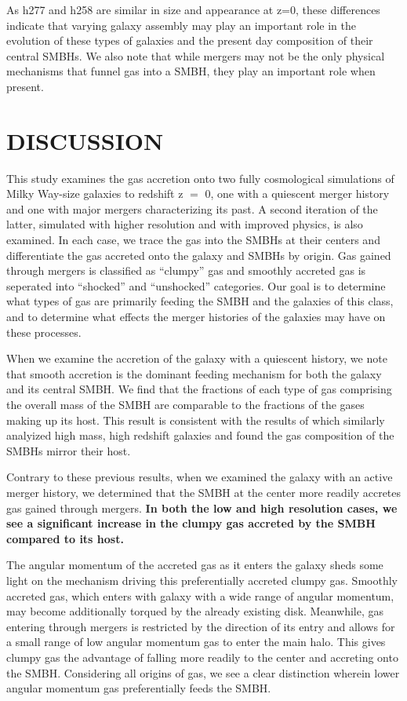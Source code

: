 \documentclass[12pt,headA,chapB]{fiskthesis}
\begin{document}
As h277 and h258 are similar in size and appearance at z=0, these differences indicate that varying galaxy assembly may play an important role in the evolution of these types of galaxies and the present day composition of their central SMBHs. We also note that while mergers may not be the only physical mechanisms that funnel gas into a SMBH, they play an important role when present.




\chapter{\normalsize DISCUSSION}
\thispagestyle{empty}
This study examines the gas accretion onto two fully cosmological simulations of Milky Way-size galaxies to redshift z $=$ 0, one with a quiescent merger history and one with major mergers characterizing its past. A second iteration of the latter, simulated with higher resolution and with improved physics, is also examined. In each case, we trace the gas into the SMBHs at their centers and differentiate the gas accreted onto the galaxy and SMBHs by origin. Gas gained through mergers is classified as ``clumpy'' gas and smoothly accreted gas is seperated into ``shocked'' and ``unshocked'' categories. Our goal is to determine what types of gas are primarily feeding the SMBH and the galaxies of this class, and to determine what effects the merger histories of the galaxies may have on these processes.

When we examine the accretion of the galaxy with a quiescent history, we note that smooth accretion is the dominant feeding mechanism for both the galaxy and its central SMBH. We find that the fractions of each type of gas comprising the overall mass of the SMBH are comparable to the fractions of the gases making up its host. This result is consistent with the results of \cite{Bellovary2013} which similarly analyized high mass, high redshift galaxies and found the gas composition of the SMBHs mirror their host.

Contrary to these previous results, when we examined the galaxy with an active merger history, we determined that the SMBH at the center more readily accretes gas gained through mergers. \textbf{In both the low and high resolution cases, we see a significant increase in the clumpy gas accreted by the SMBH compared to its host.} 

The angular momentum of the accreted gas as it enters the galaxy sheds some light on the mechanism driving this preferentially accreted clumpy gas. Smoothly accreted gas, which enters with galaxy with a wide range of angular momentum, may become additionally torqued by the already existing disk. Meanwhile, gas entering through mergers is restricted by the direction of its entry and allows for a small range of low angular momentum gas to enter the main halo. This gives clumpy gas the advantage of falling more readily to the center and accreting onto the SMBH. Considering all origins of gas, we see a clear distinction wherein lower angular momentum gas preferentially feeds the SMBH.
\end{document}
